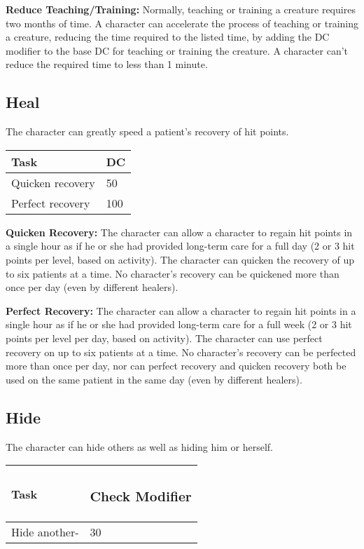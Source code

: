 \documentclass{article}
\begin{document}
\textbf{Reduce Teaching/Training: }Normally, teaching or training a creature requires 
two months of time. A character can accelerate the process of teaching or training 
a creature, reducing the time required to the listed time, by adding the DC modifier 
to the base DC for teaching or training the creature. A character can't reduce 
the required time to less than 1 minute. 

\vspace{12pt}
\subsection*{Heal }

The character can greatly speed a patient's recovery of hit points. 

\begin{tabular}{|>{\raggedright}p{70pt}|>{\raggedright}p{13pt}|}
\hline
T\textbf{ask} & D\textbf{C }\tabularnewline
\hline
Quicken recovery & 50 \tabularnewline
\hline
Perfect recovery & 100 \tabularnewline
\hline
\end{tabular}

\textbf{Quicken Recovery: }The character can allow a character to regain hit points 
in a single hour as if he or she had provided long-term care for a full day (2 
or 3 hit points per level, based on activity). The character can quicken the recovery 
of up to six patients at a time. No character's recovery can be quickened more 
than once per day (even by different healers). 

\textbf{Perfect Recovery:}\textit{ }The character can allow a character to regain 
hit points in a single hour as if he or she had provided long-term care for a full 
week (2 or 3 hit points per level per day, based on activity). The character can 
use perfect recovery on up to six patients at a time. No character's recovery can 
be perfected more than once per day, nor can perfect recovery and quicken recovery 
both be used on the same patient in the same day (even by different healers).

\vspace{12pt}
\subsection*{Hide }

The character can hide others as well as hiding him or herself. 

\begin{tabular}{|>{\raggedright}p{50pt}|>{\raggedright}p{66pt}|}
\hline
T\textbf{ask} & \subsubsection*{C\textbf{heck Modifier}}\tabularnewline
\hline
Hide another- & 30\tabularnewline
\hline
\end{tabular}
\end{document}
